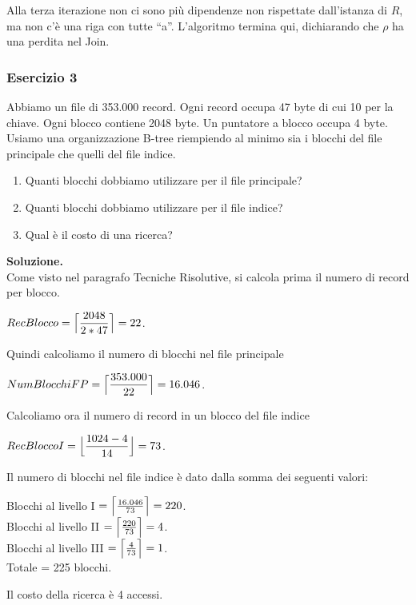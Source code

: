 Alla terza iterazione non ci sono più dipendenze non rispettate dall'istanza di $R$, ma non c'è una riga con tutte ``a''.
L'algoritmo termina qui, dichiarando che $\rho$ ha una perdita nel Join.
\subsubsection{Esercizio 3}
Abbiamo un file di 353.000 record. Ogni record occupa 47 byte di cui 10 per la chiave. Ogni blocco contiene 2048 byte. 
Un puntatore a blocco occupa 4 byte. Usiamo una organizzazione B-tree riempiendo al minimo sia i blocchi del file 
principale che quelli del file indice.

\begin{enumerate}
 \item Quanti blocchi dobbiamo utilizzare per il file principale? 
 \item Quanti blocchi dobbiamo utilizzare per il file indice?
 \item Qual è il costo di una ricerca?
\end{enumerate}

\noindent\textbf{\fontsize{14pt}{1em}Soluzione.}\\
Come visto nel paragrafo Tecniche Risolutive, si calcola prima il numero di record per blocco.
\begin{center}
 $RecBlocco = \Bigl\lceil \dfrac{2048}{2*47} \Bigr\rceil = 22$.\\
\end{center}
Quindi calcoliamo il numero di blocchi nel file principale
\begin{center}
 $NumBlocchiFP = \Bigl\lceil \dfrac{353.000}{22} \Bigr\rceil = 16.046$.\\
\end{center}
Calcoliamo ora il numero di record in un blocco del file indice
\begin{center}
 $RecBloccoI = \Bigl\lfloor \dfrac{1024-4}{14} \Bigr\rfloor = 73$.\\
\end{center}
Il numero di blocchi nel file indice è dato dalla somma dei seguenti valori:
\begin{center}
 Blocchi al livello I $= \Bigl\lceil \frac{16.046}{73} \Bigr\rceil = 220$.\\

 Blocchi al livello II $= \Bigl\lceil \frac{220}{73} \Bigr\rceil = 4$.\\

 Blocchi al livello III $= \Bigl\lceil \frac{4}{73} \Bigr\rceil = 1$.\\
 
 Totale = 225 blocchi.
\end{center}

Il costo della ricerca è 4 accessi.



  
 





